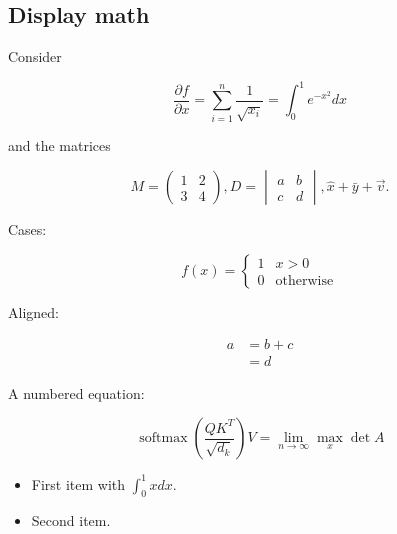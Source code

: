 \subsection{Display math}

Consider

\[
\frac{\partial f}{\partial x} = \sum_{i=1}^n \frac{1}{\sqrt{x_i}} = \int_0^1 e^{-x^2} dx
\]

and the matrices

\[
M = \begin{pmatrix}
1 & 2 \\
3 & 4
\end{pmatrix}, D = \begin{vmatrix}
a & b \\
c & d
\end{vmatrix}, \hat{x} + \bar{y} + \vec{v}.
\]

Cases:

\[
f(x) = \begin{cases}
1 & x > 0 \\
0 & \text{otherwise}
\end{cases}
\]

Aligned:

\begin{align*}
a &= b + c \\
&= d
\end{align*}

A numbered equation:

\[
\operatorname{softmax}\left( \frac{QK^T}{\sqrt{d_k}} \right)V = \lim_{n\to\infty} \max_x \det A
\]

\begin{itemize}
\item First item with \(\int_0^1 x dx\).
\item Second item.
\end{itemize}
